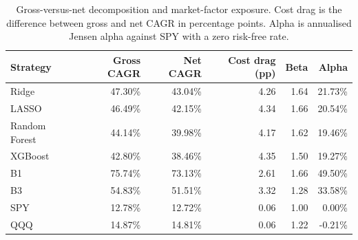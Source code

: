 \begin{table}[H]
\centering
\small
\begin{tabular}{lrrrrr}
\toprule
Strategy & Gross CAGR & Net CAGR & Cost drag (pp) & Beta & Alpha \\
\midrule
Ridge & 47.30\% & 43.04\% & 4.26 & 1.64 & 21.73\% \\
LASSO & 46.49\% & 42.15\% & 4.34 & 1.66 & 20.54\% \\
Random Forest & 44.14\% & 39.98\% & 4.17 & 1.62 & 19.46\% \\
XGBoost & 42.80\% & 38.46\% & 4.35 & 1.50 & 19.27\% \\
B1 & 75.74\% & 73.13\% & 2.61 & 1.66 & 49.50\% \\
B3 & 54.83\% & 51.51\% & 3.32 & 1.28 & 33.58\% \\
SPY & 12.78\% & 12.72\% & 0.06 & 1.00 & 0.00\% \\
QQQ & 14.87\% & 14.81\% & 0.06 & 1.22 & -0.21\% \\
\bottomrule
\end{tabular}
\caption{Gross-versus-net decomposition and market-factor exposure. Cost drag is the difference between gross and net CAGR in percentage points. Alpha is annualised Jensen alpha against SPY with a zero risk-free rate.}
\label{tab:gross_net}
\end{table}
